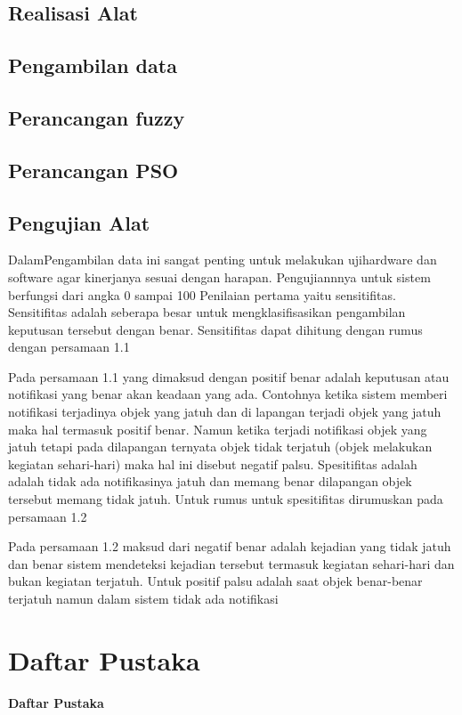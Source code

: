 \documentclass[11pt]{article}
\begin{document}
\subsection{Realisasi Alat}

\subsection{Pengambilan data}

\subsection{Perancangan fuzzy}

\subsection{Perancangan PSO}

\subsection{Pengujian Alat}

DalamPengambilan data ini sangat penting untuk melakukan ujihardware dan software agar kinerjanya sesuai dengan harapan.
Pengujiannnya untuk sistem berfungsi dari angka 0 sampai 100%
Penilaian pertama yaitu sensitifitas.
Sensitifitas adalah seberapa  besar untuk mengklasifisasikan pengambilan keputusan tersebut dengan benar.
Sensitifitas dapat dihitung dengan rumus  dengan persamaan 1.1

Pada persamaan 1.1 yang dimaksud dengan positif benar adalah keputusan atau notifikasi yang benar akan keadaan yang ada.
Contohnya ketika sistem memberi notifikasi terjadinya objek yang jatuh dan di lapangan terjadi objek yang jatuh maka hal termasuk positif benar.
Namun ketika terjadi notifikasi objek yang jatuh tetapi pada dilapangan ternyata objek tidak terjatuh (objek melakukan kegiatan sehari-hari) maka hal ini disebut negatif palsu.
Spesitifitas adalah adalah tidak ada notifikasinya jatuh dan memang benar dilapangan objek tersebut memang tidak jatuh. Untuk rumus untuk spesitifitas dirumuskan pada persamaan 1.2

Pada persamaan 1.2 maksud dari negatif benar adalah kejadian yang tidak jatuh dan benar sistem mendeteksi kejadian tersebut termasuk kegiatan sehari-hari dan bukan kegiatan terjatuh.
Untuk positif palsu adalah saat objek benar-benar terjatuh namun dalam sistem tidak ada notifikasi 
\newpage

\section{Daftar Pustaka}

\begin{center}
	\textbf{Daftar Pustaka}
\end{center}

	
	
\end{document}
